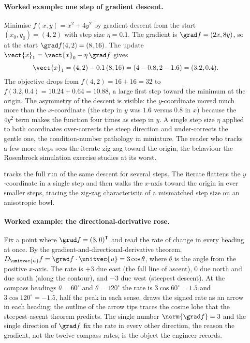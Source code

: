 \paragraph{Worked example: one step of gradient descent.} Minimise
$f(x, y) = x^{2} + 4 y^{2}$ by gradient descent from the start
$(x_{0}, y_{0}) = (4, 2)$ with step size $\eta = 0.1$. The gradient
is $\grad f = (2x, 8y)$, so at the start $\grad f(4, 2) = (8, 16)$.
The update $\vect{x}_{1} = \vect{x}_{0} - \eta\,\grad f$ gives
\[
\vect{x}_{1} = (4, 2) - 0.1\,(8, 16) = (4 - 0.8, 2 - 1.6)
= (3.2, 0.4).
\]
The objective drops from $f(4, 2) = 16 + 16 = 32$ to $f(3.2, 0.4) =
10.24 + 0.64 = 10.88$, a large first step toward the minimum at the
origin. The asymmetry of the descent is visible: the $y$-coordinate
moved much more than the $x$-coordinate (the step in $y$ was $1.6$
versus $0.8$ in $x$) because the $4y^{2}$ term makes the function
four times as steep in $y$. A single step size $\eta$ applied to both
coordinates over-corrects the steep direction and under-corrects the
gentle one, the condition-number pathology in miniature. The reader
who tracks a few more steps sees the iterate zig-zag toward the
origin, the behaviour the Rosenbrock simulation exercise studies at
its worst.



 tracks the full run of the same
descent for several steps. The iterate flattens the $y$-coordinate in a
single step and then walks the $x$-axis toward the origin in ever
smaller steps, tracing the zig-zag characteristic of a mismatched step
size on an anisotropic bowl.

\paragraph{Worked example: the directional-derivative rose.} Fix a point
where $\grad f = (3, 0)^{\mathsf{T}}$ and read the rate of change in
every heading at once. By the gradient-and-directional-derivative
theorem, $D_{\unitvec{u}} f = \grad f \cdot \unitvec{u} = 3\cos\theta$,
where $\theta$ is the angle from the positive $x$-axis. The rate is
$+3$ due east (the fall line of ascent), $0$ due north and due south
(along the contour), and $-3$ due west (steepest descent). At the
compass headings $\theta = 60^{\circ}$ and $\theta = 120^{\circ}$ the
rate is $3\cos 60^{\circ} = 1.5$ and $3\cos 120^{\circ} = -1.5$, half
the peak in each sense.  draws the
signed rate as an arrow in each heading; the outline of the arrow tips
traces the cosine lobe that the steepest-ascent theorem predicts. The
single number $\norm{\grad f} = 3$ and the single direction of
$\grad f$ fix the rate in every other direction, the reason the gradient,
not the twelve compass rates, is the object the engineer records.

